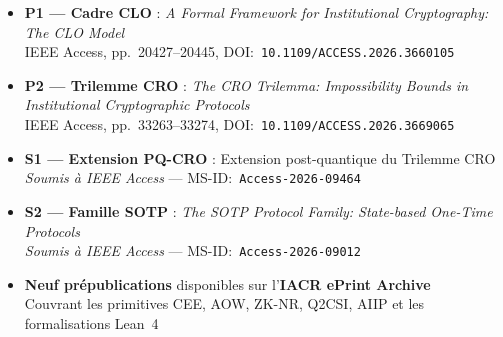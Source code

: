 \begin{tcolorbox}[
    enhanced,
    colback=white,
    colframe=CouleurAccent,
    fonttitle=\bfseries\color{white},
    title={\ding{167}\quad Contributions Scientifiques Sélectionnées},
    attach boxed title to top left={yshift=-2mm, xshift=4mm},
    boxed title style={colback=CouleurAccent, rounded corners},
    arc=3pt, boxrule=0.8pt,
    left=8pt, right=8pt, top=10pt, bottom=8pt
]

\begin{itemize}
    \item \textbf{P1 — Cadre CLO} : \textit{A Formal Framework for Institutional Cryptography: The CLO Model}\\
          {\footnotesize IEEE Access, pp.~20427--20445, DOI:~\texttt{10.1109/ACCESS.2026.3660105}}

    \item \textbf{P2 — Trilemme CRO} : \textit{The CRO Trilemma: Impossibility Bounds in Institutional Cryptographic Protocols}\\
          {\footnotesize IEEE Access, pp.~33263--33274, DOI:~\texttt{10.1109/ACCESS.2026.3669065}}

    \item \textbf{S1 — Extension PQ-CRO} : Extension post-quantique du Trilemme CRO\\
          {\footnotesize \textit{Soumis à IEEE Access} --- MS-ID:~\texttt{Access-2026-09464}}

    \item \textbf{S2 — Famille SOTP} : \textit{The SOTP Protocol Family: State-based One-Time Protocols}\\
          {\footnotesize \textit{Soumis à IEEE Access} --- MS-ID:~\texttt{Access-2026-09012}}

    \item \textbf{Neuf prépublications} disponibles sur l'\textbf{IACR ePrint Archive}\\
          {\footnotesize Couvrant les primitives CEE, AOW, ZK-NR, Q2CSI, AIIP et les formalisations Lean~4}
\end{itemize}

\end{tcolorbox}

\vspace{1ex}


